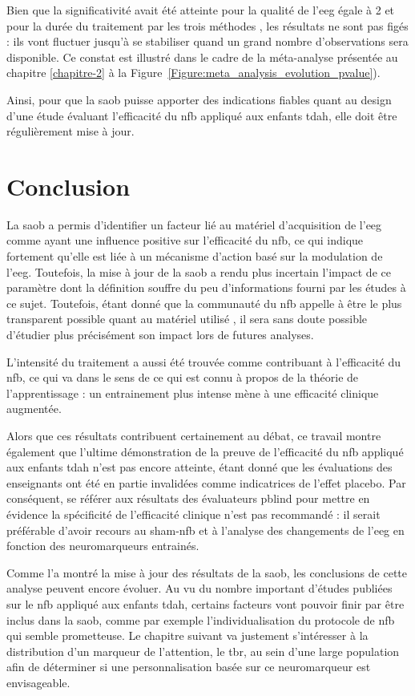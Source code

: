 Bien que la significativité avait été atteinte pour la qualité de l'\gls{eeg} égale à 2 et pour la durée du traitement par les trois méthodes \citep{Bussalb2019clinical}, 
les résultats ne sont pas figés : ils vont fluctuer jusqu'à se stabiliser quand un grand nombre d'observations sera disponible. Ce constat est illustré dans le cadre de la méta-analyse 
présentée au chapitre \ref{chapitre-2} à la Figure~\ref{Figure:meta_analysis_evolution_pvalue}).

Ainsi, pour que la \gls{saob} puisse apporter des indications fiables quant au design d'une étude évaluant l'efficacité du \gls{nfb} appliqué aux enfants \gls{tdah}, elle doit être 
régulièrement mise à jour. 

\section{Conclusion}

La \gls{saob} a permis d'identifier un facteur lié au matériel d'acquisition de l'\gls{eeg} comme ayant une influence positive sur l'efficacité du \gls{nfb}, 
ce qui indique fortement qu'elle est liée à un mécanisme d'action basé sur la modulation de l'\gls{eeg}. Toutefois, la mise à jour de la \gls{saob} a rendu
plus incertain l'impact de ce paramètre dont la définition souffre du peu d'informations fourni par les études à ce sujet. Toutefois, étant donné que la
communauté du \gls{nfb} appelle à être le plus transparent possible quant au matériel utilisé \citep{Ros2019}, il sera sans doute possible d'étudier plus précisément
son impact lors de futures analyses.

L'intensité du traitement a aussi été trouvée comme contribuant à l'efficacité du \gls{nfb}, ce qui va dans le sens de ce qui est connu à propos de 
la théorie de l'apprentissage \citep{Mowrer1960} : un entrainement plus intense mène à une efficacité clinique augmentée. 

Alors que ces résultats contribuent certainement au débat, ce travail montre également que l'ultime démonstration de la preuve de l'efficacité du \gls{nfb}
appliqué aux enfants \gls{tdah} n'est pas encore atteinte, étant donné que les évaluations des enseignants ont été en partie invalidées comme indicatrices de 
l'effet placebo. Par conséquent, se référer aux résultats des évaluateurs \gls{pblind} pour mettre en évidence la spécificité de l'efficacité clinique n'est pas 
recommandé : il serait préférable d'avoir recours au sham-\gls{nfb} et à l'analyse des changements de l'\gls{eeg} en fonction des neuromarqueurs entrainés.

Comme l'a montré la mise à jour des résultats de la \gls{saob}, les conclusions de cette analyse peuvent encore évoluer. Au vu du nombre important 
d'études publiées sur le \gls{nfb} appliqué aux enfants \gls{tdah}, certains facteurs vont pouvoir finir par être inclus dans la \gls{saob}, comme par exemple 
l'individualisation du protocole de \gls{nfb} qui semble prometteuse. Le chapitre suivant va justement s'intéresser à la distribution d'un marqueur de l'attention, 
le \gls{tbr}, au sein d'une large population afin de déterminer si une personnalisation basée sur ce neuromarqueur est envisageable.




 